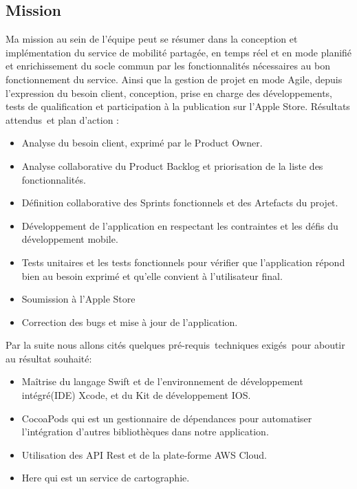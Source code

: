 \subsection{Mission} %
\label{sub:mission}
Ma mission au sein de l’équipe peut se résumer dans la conception et implémentation du service de mobilité partagée, en temps réel et en mode planifié et enrichissement du socle commun par les fonctionnalités nécessaires au bon fonctionnement du service.\newline
Ainsi que la gestion de projet en mode Agile, depuis l’expression du besoin client, conception, prise en charge des développements, tests de qualification et participation à la publication sur l'Apple Store.\newline
Résultats attendus et plan d’action :
\begin{itemize}
	\item Analyse du besoin client, exprimé par le Product Owner.
	\item Analyse collaborative du Product Backlog et priorisation de la liste des fonctionnalités.
	\item Définition collaborative des Sprints fonctionnels et des Artefacts du projet.
	\item Développement de l’application en respectant les contraintes et les défis du développement mobile.
	\item Tests unitaires et les tests fonctionnels
	 pour vérifier que l’application répond bien au besoin exprimé et qu’elle convient à l’utilisateur final.
	\item Soumission à l'Apple Store
	\item Correction des bugs et mise à jour de l’application.
\end{itemize}
Par la suite nous allons cités quelques pré-requis techniques exigés pour aboutir au résultat souhaité:
\begin{itemize}
	\item Maîtrise du langage Swift et de l’environnement de développement intégré(IDE) Xcode, et du Kit de développement IOS.
	\item CocoaPods qui est un gestionnaire de dépendances pour automatiser l’intégration d'autres bibliothèques dans notre application.
	\item Utilisation des API Rest et de la plate-forme AWS Cloud.
	\item Here qui est un service de cartographie.
\end{itemize}

